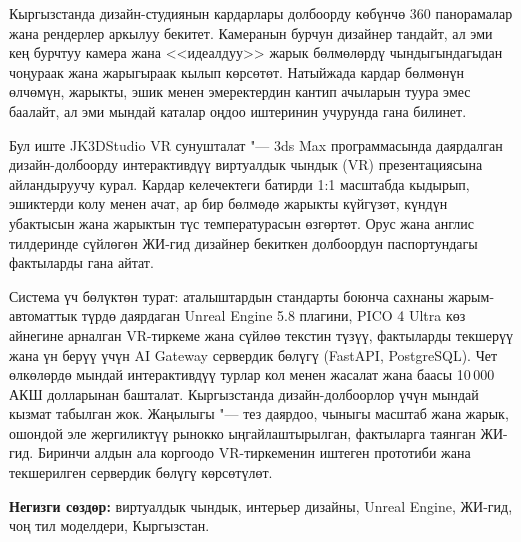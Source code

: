 Кыргызстанда дизайн-студиянын кардарлары долбоорду көбүнчө 360\textdegree{} панорамалар жана рендерлер аркылуу бекитет. Камеранын бурчун дизайнер тандайт, ал эми кең бурчтуу камера жана <<идеалдуу>> жарык бөлмөлөрдү чындыгындагыдан чоңураак жана жарыгыраак кылып көрсөтөт. Натыйжада кардар бөлмөнүн өлчөмүн, жарыкты, эшик менен эмеректердин кантип ачыларын туура эмес баалайт, ал эми мындай каталар оңдоо иштеринин учурунда гана билинет.

Бул иште JK3DStudio VR сунушталат "--- 3ds Max программасында даярдалган дизайн-долбоорду интерактивдүү виртуалдык чындык (VR) презентациясына айландыруучу курал. Кардар келечектеги батирди 1:1 масштабда кыдырып, эшиктерди колу менен ачат, ар бир бөлмөдө жарыкты күйгүзөт, күндүн убактысын жана жарыктын түс температурасын өзгөртөт. Орус жана англис тилдеринде сүйлөгөн ЖИ-гид дизайнер бекиткен долбоордун паспортундагы фактыларды гана айтат.

Система үч бөлүктөн турат: аталыштардын стандарты боюнча сахнаны жарым-автоматтык түрдө даярдаган Unreal Engine 5.8 плагини, PICO 4 Ultra көз айнегине арналган VR-тиркеме жана сүйлөө текстин түзүү, фактыларды текшерүү жана үн берүү үчүн AI Gateway сервердик бөлүгү (FastAPI, PostgreSQL). Чет өлкөлөрдө мындай интерактивдүү турлар кол менен жасалат жана баасы 10\,000 АКШ долларынан башталат. Кыргызстанда дизайн-долбоорлор үчүн мындай кызмат табылган жок. Жаңылыгы "--- тез даярдоо, чыныгы масштаб жана жарык, ошондой эле жергиликтүү рынокко ыңгайлаштырылган, фактыларга таянган ЖИ-гид. Биринчи алдын ала коргоодо VR-тиркеменин иштеген прототиби жана текшерилген сервердик бөлүгү көрсөтүлөт.

\medskip\noindent\textbf{Негизги сөздөр:} виртуалдык чындык, интерьер дизайны, Unreal Engine, ЖИ-гид, чоң тил моделдери, Кыргызстан.

